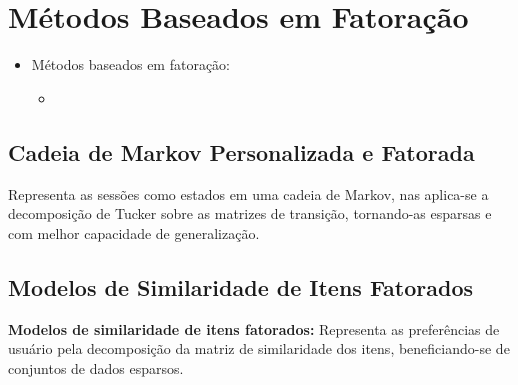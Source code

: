 \section{Métodos Baseados em Fatoração}

\begin{itemize}
    
      
    \item Métodos baseados em fatoração:
      \begin{itemize}
        \item
      \end{itemize}
\end{itemize}


\subsection{Cadeia de Markov Personalizada e Fatorada}
 Representa as
        sessões como estados em uma cadeia de Markov, nas aplica-se a
        decomposição de Tucker sobre as matrizes de transição, tornando-as
        esparsas e com melhor capacidade de generalização\cite{mkv}.

\subsection{Modelos de Similaridade de Itens Fatorados}
\textbf{Modelos de similaridade de itens fatorados:} Representa as
preferências de usuário pela decomposição da matriz de similaridade dos
itens, beneficiando-se de conjuntos de dados esparsos\cite{fuse}.